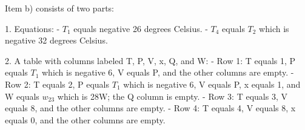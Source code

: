 Item b) consists of two parts:

1. Equations:
   - \( T_1 \) equals negative 26 degrees Celsius.
   - \( T_4 \) equals \( T_2 \) which is negative 32 degrees Celsius.

2. A table with columns labeled T, P, V, x, Q, and W:
   - Row 1: T equals 1, P equals \( T_1 \) which is negative 6, V equals P, and the other columns are empty.
   - Row 2: T equals 2, P equals \( T_1 \) which is negative 6, V equals P, x equals 1, and W equals \( w_{23} \) which is 28W; the Q column is empty.
   - Row 3: T equals 3, V equals 8, and the other columns are empty.
   - Row 4: T equals 4, V equals 8, x equals 0, and the other columns are empty.